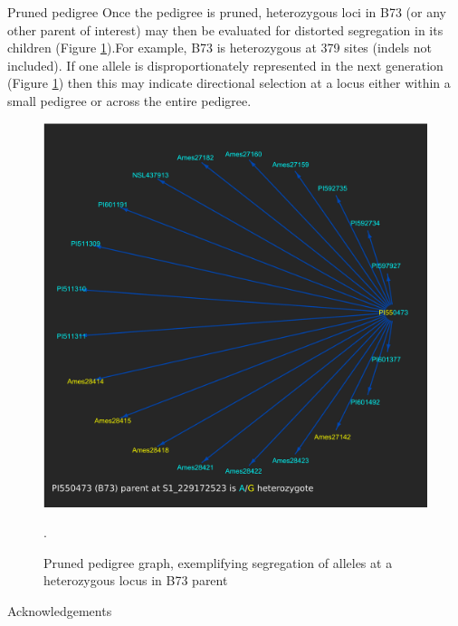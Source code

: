 \documentclass[final]{beamer}
\newlength{\onecolwid}
\begin{document}
\begin{frame}[t]
\begin{columns}[t]
\begin{column}{\onecolwid}
\begin{block}{Pruned pedigree}
Once the pedigree is pruned, heterozygous loci in B73 (or any other parent of interest) may then be evaluated for distorted segregation in its children (Figure \ref{fig:het_seg}).For example, B73 is heterozygous at 379 sites (indels not included). If one allele is disproportionately represented in the next generation (Figure \ref{fig:het_seg}) then this may indicate directional selection at a locus either within a small pedigree or across the entire pedigree.
\begin{figure}
\includegraphics[width=1.0\linewidth]{Pruned.pdf}
\caption{Pruned pedigree graph, exemplifying segregation of alleles at a heterozygous locus in B73 parent}.
\label{fig:het_seg}%
\end{figure}

\end{block}



\begin{block}{Acknowledgements}


\end{block}
\end{column}
\end{columns}
\end{frame}
\end{document}
